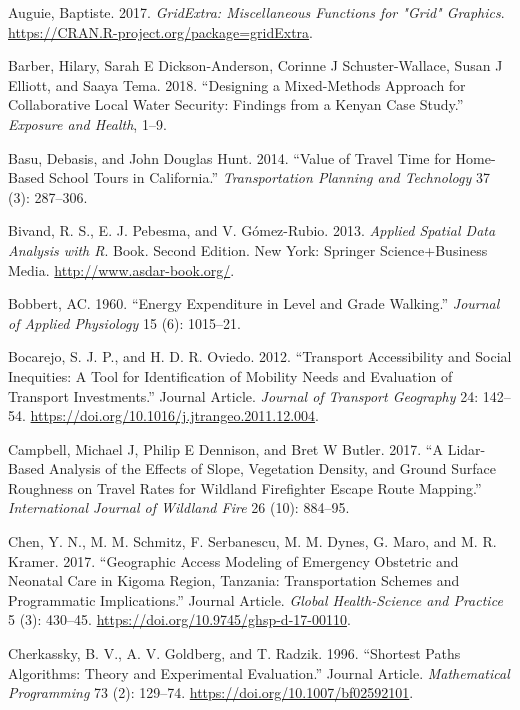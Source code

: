 \documentclass[]{elsarticle} %
\begin{document}
\leavevmode\hypertarget{ref-Auguie2017}{}%
Auguie, Baptiste. 2017. \emph{GridExtra: Miscellaneous Functions for
"Grid" Graphics}. \url{https://CRAN.R-project.org/package=gridExtra}.

\leavevmode\hypertarget{ref-Barber2018designing}{}%
Barber, Hilary, Sarah E Dickson-Anderson, Corinne J Schuster-Wallace,
Susan J Elliott, and Saaya Tema. 2018. ``Designing a Mixed-Methods
Approach for Collaborative Local Water Security: Findings from a Kenyan
Case Study.'' \emph{Exposure and Health}, 1--9.

\leavevmode\hypertarget{ref-Basu2014value}{}%
Basu, Debasis, and John Douglas Hunt. 2014. ``Value of Travel Time for
Home-Based School Tours in California.'' \emph{Transportation Planning
and Technology} 37 (3): 287--306.

\leavevmode\hypertarget{ref-Bivand2013asdar}{}%
Bivand, R. S., E. J. Pebesma, and V. Gómez-Rubio. 2013. \emph{Applied
Spatial Data Analysis with R}. Book. Second Edition. New York: Springer
Science+Business Media. \url{http://www.asdar-book.org/}.

\leavevmode\hypertarget{ref-Bobbert1960energy}{}%
Bobbert, AC. 1960. ``Energy Expenditure in Level and Grade Walking.''
\emph{Journal of Applied Physiology} 15 (6): 1015--21.

\leavevmode\hypertarget{ref-Bocarejo2012}{}%
Bocarejo, S. J. P., and H. D. R. Oviedo. 2012. ``Transport Accessibility
and Social Inequities: A Tool for Identification of Mobility Needs and
Evaluation of Transport Investments.'' Journal Article. \emph{Journal of
Transport Geography} 24: 142--54.
\url{https://doi.org/10.1016/j.jtrangeo.2011.12.004}.

\leavevmode\hypertarget{ref-Campbell2017}{}%
Campbell, Michael J, Philip E Dennison, and Bret W Butler. 2017. ``A
Lidar-Based Analysis of the Effects of Slope, Vegetation Density, and
Ground Surface Roughness on Travel Rates for Wildland Firefighter Escape
Route Mapping.'' \emph{International Journal of Wildland Fire} 26 (10):
884--95.

\leavevmode\hypertarget{ref-Chen2017}{}%
Chen, Y. N., M. M. Schmitz, F. Serbanescu, M. M. Dynes, G. Maro, and M.
R. Kramer. 2017. ``Geographic Access Modeling of Emergency Obstetric and
Neonatal Care in Kigoma Region, Tanzania: Transportation Schemes and
Programmatic Implications.'' Journal Article. \emph{Global
Health-Science and Practice} 5 (3): 430--45.
\url{https://doi.org/10.9745/ghsp-d-17-00110}.

\leavevmode\hypertarget{ref-Cherkassky1996}{}%
Cherkassky, B. V., A. V. Goldberg, and T. Radzik. 1996. ``Shortest Paths
Algorithms: Theory and Experimental Evaluation.'' Journal Article.
\emph{Mathematical Programming} 73 (2): 129--74.
\url{https://doi.org/10.1007/bf02592101}.
\end{document}
